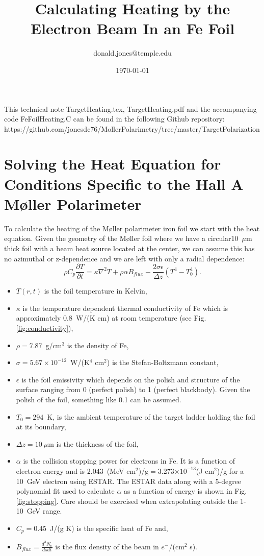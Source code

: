 \documentclass[12pt]{article}
\title{\color{BlueViolet}\bfseries\Huge Calculating Heating by the Electron Beam In an Fe Foil}
\author{\color{BurntOrange}donald.jones@temple.edu}
\date{\today}
\begin{document}
\maketitle

This technical note TargetHeating.tex, TargetHeating.pdf and the accompanying code FeFoilHeating.C can be found in the following Github repository: \\https://github.com/jonesdc76/MollerPolarimetry/tree/master/TargetPolarization
\section{Solving the Heat Equation for Conditions Specific to the Hall A M\o ller Polarimeter}
To calculate the heating of the M\o ller polarimeter iron foil we start with the heat equation. Given the geometry of the M\o ller foil where we have a circular10~$\mu$m thick foil with a beam heat source located at the center, we can assume this has no azimuthal or z-dependence and we are left with only a radial dependence:
\begin{equation}
\label{eq:heat_T_r_t}
\rho C_p\frac{\partial T}{\partial t}=\kappa\nabla^2T+\rho\alpha B_{flux}-\frac{2\sigma\epsilon}{\Delta z}\left(T^4-T_0^4\right).
\end{equation}
\begin{itemize}
\item{$T(r, t)$ is the foil temperature in Kelvin,}
\item{$\kappa$ is the temperature dependent thermal conductivity of Fe which is approximately 0.8~W/(K cm) at room temperature (see Fig. \ref{fig:conductivity}),}
\item{$\rho =7.87$~g/cm$^3$ is the density of Fe,}
\item{$\sigma =5.67\times 10^{-12}$~W/(K$^4$ cm$^2$) is the Stefan-Boltzmann constant,}
\item{$\epsilon$ is the foil emissivity which depends on the polish and structure of the surface ranging from 0 (perfect polish) to 1 (perfect blackbody). Given the polish of the foil, something like 0.1 can be assumed.}
\item{$T_0=294$~K, is the ambient temperature of the target ladder holding the foil at its boundary,}
\item{$\Delta z=10~\mu$m is the thickness of the foil,}
\item{$\alpha$ is the collision stopping power for electrons in Fe. It is a function of electron energy and is 2.043~(MeV cm$^2$)/g$=$3.273$\times 10^{-13}$(J cm$^2$)/g for a 10~GeV electron using ESTAR. The ESTAR data along with a 5-degree polynomial fit used to calculate $\alpha$ as a function of energy is shown in Fig. \ref{fig:stopping}. Care should be exercised when extrapolating outside the 1-10~GeV range.}
\item{$C_p=0.45$~J/(g K) is the specific heat of Fe and,} 
\item{$B_{flux}=\frac{d^3N_e}{ds dt} $ is the flux density of the beam in $e^-$/(cm$^2$ s).}
\end{itemize}
\end{document}
